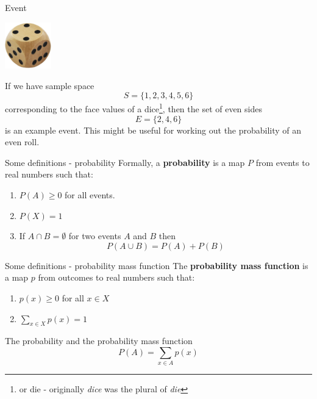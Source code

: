 \documentclass{beamer}
\newcommand{\crish}{\color{reddish}}
\newcommand{\cbla}{\color{black}}
\begin{document}
\begin{frame}{Event}
\begin{center}
    \includegraphics[width=2cm]{dice.jpg}
\end{center}  
If we have sample space \crish$$S=\{1,2,3,4,5,6\}$$\cbla{} corresponding to the
face values of a dice\footnote{or die - originally \textsl{dice} was the plural of \textsl{die}}, then the set of even sides \crish$$E=\{2,4,6\}$$\cbla{} is an
example event. This might be useful for working out the probability of an even roll.
\end{frame}

\begin{frame}{Some definitions - probability}
Formally, a \textbf{probability} is a map \crish$P$\cbla{}  from
events to real numbers such that:
\begin{enumerate}
\item \crish$P(A)\ge 0$\cbla{}  for all events.
\item \crish$P(X)=1$\cbla{} 
\item If \crish$A\cap B=\emptyset$\cbla{}  for two events \crish$A$\cbla{}  and \crish$B$\cbla{}  then 
\crish$$
P(A\cup B)=P(A)+P(B)
$$\cbla{}
\end{enumerate}
\end{frame}  

\begin{frame}{Some definitions - probability mass function}
The \textbf{probability mass function} is a map \crish$p$\cbla{}  from outcomes to real numbers such that:
\begin{enumerate}
\item \crish$p(x)\ge 0$\cbla{}  for all \crish$x\in X$\cbla{} 
\item \crish$\sum_{x\in X} p(x)=1$\cbla{} 
\end{enumerate}
\end{frame}

\begin{frame}{The probability and the probability mass function}
\crish$$
P(A)=\sum_{x\in A}p(x)
$$\cbla{}
\end{frame}

  
\end{document}
